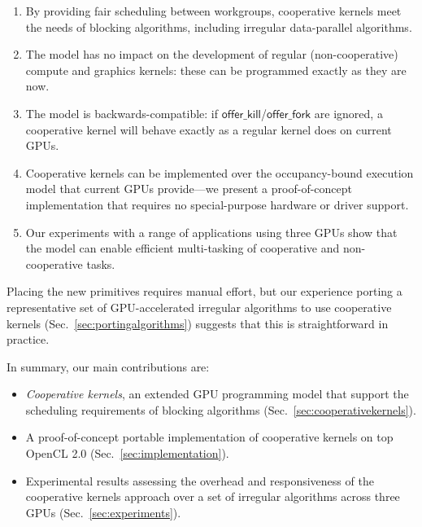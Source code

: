 \documentclass[numbers,nocopyrightspace,10pt]{sigplanconf}
\newcommand{\mysec}{Sec.~}
\newcommand{\offerfork}{\mathsf{offer\_fork}}
\newcommand{\offerkill}{\mathsf{offer\_kill}}
\begin{document}
\begin{enumerate}

\item By providing fair scheduling between workgroups, cooperative
  kernels meet the needs of blocking algorithms, including irregular
  data-parallel algorithms.

\item The model has no impact on the development of regular
  (non-cooperative) compute and graphics kernels: these can be programmed exactly as they
  are now.

\item The model is backwards-compatible: if $\offerkill$/$\offerfork$ are ignored, a cooperative kernel will behave
  exactly as a regular kernel does on current GPUs.

\item Cooperative kernels can be implemented over the occupancy-bound
  execution model that current GPUs provide---we present a
  proof-of-concept implementation that requires
  no special-purpose hardware or driver support.

\item Our experiments with a range of applications using three GPUs show that the model can enable efficient multi-tasking of cooperative and non-cooperative
  tasks.

\end{enumerate}

Placing the new primitives requires manual effort, but our experience porting a representative set of
GPU-accelerated irregular algorithms to use cooperative kernels
(\mysec\ref{sec:portingalgorithms}) suggests that this is straightforward in practice.

In summary, our main contributions are:

\begin{itemize}

\item \emph{Cooperative kernels}, an extended GPU programming model that support the scheduling requirements of blocking algorithms (\mysec\ref{sec:cooperativekernels}). 

\item A proof-of-concept portable implementation of cooperative
  kernels on top OpenCL 2.0
  (\mysec\ref{sec:implementation}).

\item Experimental results assessing the overhead and responsiveness of the cooperative kernels approach over a set of irregular algorithms across three GPUs (\mysec\ref{sec:experiments}).

\end{itemize}
\end{document}

